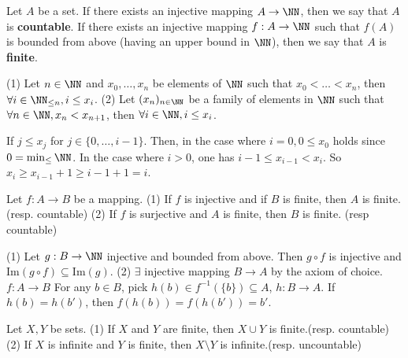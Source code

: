 \begin{definitionenv}
    Let $A$ be a set. If there exists an injective mapping $A\rightarrow \NN$,  then we say that $A$ is \textbf{countable}.
    If  there exists an injective mapping $f:A\rightarrow \NN$ such that $f(A)$ is bounded from above (having an upper bound in $\NN$),  then we say that $A$ is \textbf{finite}.
\end{definitionenv}
\begin{lemmaenv}\label{4.9.8}
    \quad
    \newline
    (1) Let $n\in \NN$ and $x_0, \dots , x_n$ be elements of $\NN$ such that $x_0<\dots<x_n$,  then $\forall i\in \NN_{\leq n}, i\leq x_i$.
    \newline
    (2) Let $(x_n)_{n\in \NN}$ be a family of elements in $\NN$ such that $\forall n\in \NN, x_n<x_{n+1}$,  then $\forall i\in \NN, i\le x_i$.
\end{lemmaenv}
\begin{proofenv}
    If $j\le x_j$ for $j\in \{0, \dots, i-1\}$. Then,  in the case where $i=0, 0\le x_0$ holds since $0=\min_\le \NN$. In the case where $i>0$,  one has $i-1\le x_{i-1}<x_i$. So $x_i\ge x_{i-1}+1\ge i-1+1=i$.
\end{proofenv}
\begin{propositionenv}
    Let $f:A\rightarrow B$ be a mapping.
    \newline
    (1) If $f$ is injective and if $B$ is finite,  then $A$ is finite. (resp. countable)
    \newline
    (2) If $f$ is surjective and $A$ is finite,  then $B$ is finite. (resp countable)
\end{propositionenv}
\begin{proofenv}
    \quad
    \newline
    (1) Let $g:B\rightarrow \NN$ injective and bounded from above. Then $g\circ f$ is injective and $\mathrm{Im}(g\circ f)\subseteq \mathrm{Im}(g)$.
    \newline
    (2) $\exists$ injective mapping $B\rightarrow A$ by the axiom of choice. $f:A\rightarrow B$ For any $b\in B$,  pick $h(b)\in f^{-1}(\{b\})\subseteq A$, $h:B\rightarrow A$. If $h(b)=h(b')$,  then $f(h(b))=f(h(b'))=b'$.
\end{proofenv}
\begin{propositionenv}
    Let $X, Y$ be sets.
    \newline
    (1) If $X$ and $Y$ are finite,  then $X\cup Y$ is finite.(resp. countable)
    \newline
    (2) If $X$ is infinite and $Y$ is finite,  then $X\setminus Y$ is infinite.(resp. uncountable)
\end{propositionenv}
